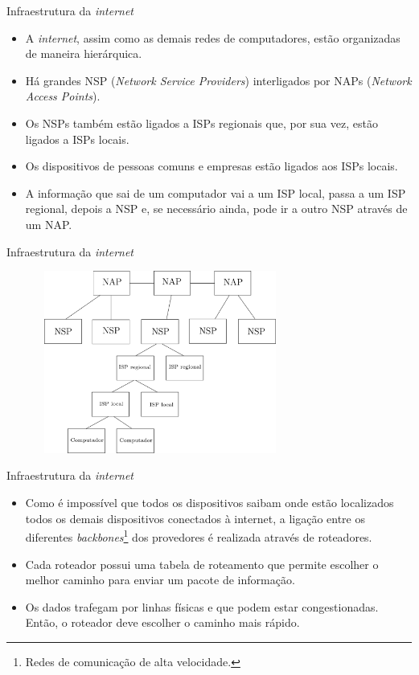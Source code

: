 \documentclass[11pt]{beamer}
\begin{document}
    \begin{frame}{Infraestrutura da \textit{internet}}
      \begin{itemize}
        \item A \textit{internet}, assim como as demais redes de computadores, estão organizadas de maneira hierárquica.
        \item Há grandes NSP (\textit{Network Service Providers}) interligados por NAPs (\textit{Network Access Points}).
        \item Os NSPs também estão ligados a ISPs regionais que, por sua vez, estão ligados a ISPs locais. 
        \item Os dispositivos de pessoas comuns e empresas estão ligados aos ISPs locais.
        \item A informação que sai de um computador vai a um ISP local, passa a um ISP regional, depois a NSP e, se necessário ainda, pode ir a outro NSP através de um NAP.
      \end{itemize}
    \end{frame}

    \begin{frame}{Infraestrutura da \textit{internet}}
      \begin{figure}
        \includegraphics[width=8cm, height=6cm]{figures/hierarquia_internet.png}
      \end{figure}
    \end{frame}

    \begin{frame}{Infraestrutura da \textit{internet}}
      \begin{itemize}
        \item Como é impossível que todos os dispositivos saibam onde estão localizados todos os demais dispositivos conectados à internet, a ligação entre os diferentes \textit{backbones}\footnote{Redes de comunicação de alta velocidade.} dos provedores é realizada através de roteadores.
        \item Cada roteador possui uma tabela de roteamento que permite escolher o melhor caminho para enviar um pacote de informação.
        \item Os dados trafegam por linhas físicas e que podem estar congestionadas. Então, o roteador deve escolher o caminho mais rápido.
      \end{itemize}
    \end{frame}
\end{document}
